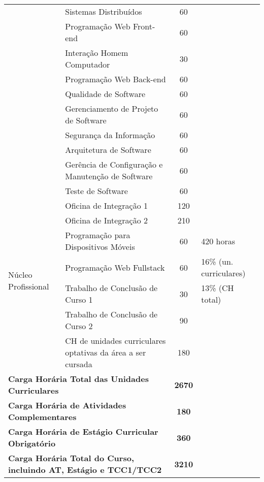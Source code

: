 \begin{quadro}[ht!]
\begin{tabular}{|l|l|c|p{3.2cm}|}
\cline{2-3} & Sistemas Distribuídos & 60 & \\
\cline{2-3} & Programação Web Front-end & 60 & \\
\cline{2-3} & Interação Homem Computador & 30 & \\
\cline{2-3} & Programação Web Back-end & 60 & \\
\cline{2-3} & Qualidade de Software & 60 & \\
\cline{2-3} & Gerenciamento de Projeto de Software & 60 & \\
\cline{2-3} & Segurança da Informação & 60 & \\
\cline{2-3} & Arquitetura de Software & 60 & \\
\cline{2-3} & Gerência de Configuração e Manutenção de Software & 60 & \\
\cline{2-3} & Teste de Software  & 60 & \\
\cline{2-3} & Oficina de Integração 1 & 120 & \\
\cline{2-3} & Oficina de Integração 2 & 210 & \\
\hline
\multirow{4}{*}{Núcleo Profissional} & Programação para Dispositivos Móveis & 60 & 420 horas  \\
\cline{2-3} & Programação Web Fullstack & 60 & 16\% (un. curriculares)\\
\cline{2-3} & Trabalho de Conclusão de Curso 1 & 30 & 13\% (CH total)\\
\cline{2-3} & Trabalho de Conclusão de Curso 2 & 90 & \\
\cline{2-3} & CH de unidades curriculares optativas da área a ser cursada & 180 & \\
\hline
\multicolumn{2}{|l|}{\textbf{Carga Horária Total das Unidades Curriculares}} & \textbf{2670} &  \\\hline
\multicolumn{2}{|l|}{\textbf{Carga Horária de Atividades Complementares}} & \textbf{180} &  \\\hline
\multicolumn{2}{|l|}{\textbf{Carga Horária de Estágio Curricular Obrigatório}} & \textbf{360} &  \\\hline
\multicolumn{2}{|l|}{\textbf{Carga Horária Total do Curso, incluindo AT, Estágio e TCC1/TCC2}} & \textbf{3210} & \\\hline
\end{tabular}
\end{quadro}
